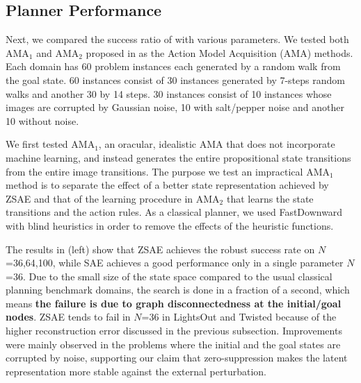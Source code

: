 \subsection{Planner Performance}

Next, we compared the success ratio of \latentplanner with various parameters.
We tested both AMA$_1$ and AMA$_2$ proposed in \cite{Asai2018} as the Action Model Acquisition (AMA) methods.
% 
Each domain has 60 problem instances each generated by a random walk from
the goal state. 60 instances consist of 30 instances generated by 7-steps random walks
and another 30 by 14 steps. 30 instances consist of 10 instances whose images are corrupted by Gaussian noise,
10 with salt/pepper noise and another 10 without noise.

We first tested AMA$_1$, an oracular, idealistic AMA that does not incorporate machine learning,
and instead generates the entire propositional state transitions from the entire image transitions.
The purpose we test an impractical AMA$_1$ method is
to separate the effect of a better state representation achieved by ZSAE
and that of the learning procedure in AMA$_2$ that learns the state transitions and the action rules.
As a classical planner, we used FastDownward \cite{Helmert04} with blind heuristics in order to
remove the effects of the heuristic functions.

The results in  (left) show that ZSAE achieves the robust success rate on $N$=36,64,100,
while SAE achieves a good performance only in a single parameter $N$=36.
% 
Due to the small size of the state space compared to the usual classical planning benchmark domains,
the search is done in a fraction of a second, which means \textbf{the failure is due to graph disconnectedness at the initial/goal nodes}.
ZSAE tends to fail in $N$=36 in LightsOut and Twisted because of the higher reconstruction error
discussed in the previous subsection.
% 
Improvements were mainly observed in the problems where
the initial and the goal states are corrupted by noise, supporting our claim that
zero-suppression makes the latent representation more stable against the external perturbation.

